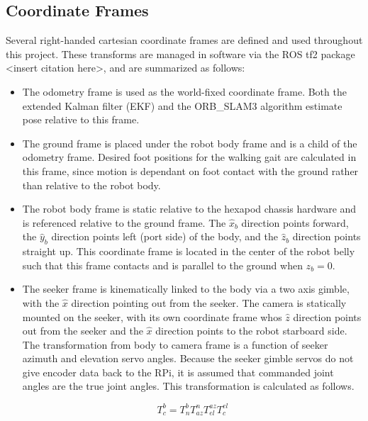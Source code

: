 \subsection{ Coordinate Frames }

Several right-handed cartesian coordinate frames are defined and used throughout this project. These transforms are managed in software via the ROS tf2 package <insert citation here>, and are summarized as follows:

\begin{itemize}
    \item The odometry frame is used as the world-fixed coordinate frame. Both the extended Kalman filter (EKF) and the ORB\_SLAM3 algorithm estimate pose relative to this frame.

    \item The ground frame is placed under the robot body frame and is a child of the odometry frame. Desired foot positions for the walking gait are calculated in this frame, since motion is dependant on foot contact with the ground rather than relative to the robot body.

    \item The robot body frame is static relative to the hexapod chassis hardware and is referenced relative to the ground frame. The $\hat{x}_b$ direction points forward, the $\hat{y}_b$ direction points left (port side) of the body, and the $\hat{z}_b$ direction points straight up. This coordinate frame is located in the center of the robot belly such that this frame contacts and is parallel to the ground when $z_b = 0$.

    \item The seeker frame is kinematically linked to the body via a two axis gimble, with the $\hat{x}$ direction pointing out from the seeker. The camera is statically mounted on the seeker, with its own coordinate frame whos $\hat{z}$ direction points out from the seeker and the $\hat{x}$ direction points to the robot starboard side. The transformation from body to camera frame is a function of seeker azimuth and elevation servo angles. Because the seeker gimble servos do not give encoder data back to the RPi, it is assumed that commanded joint angles are the true joint angles. This transformation is calculated as follows.

    \[
    T^b_c = T^b_n T^n_{az} T^{az}_{el} T^{el}_{c}
    \]


\end{itemize}
